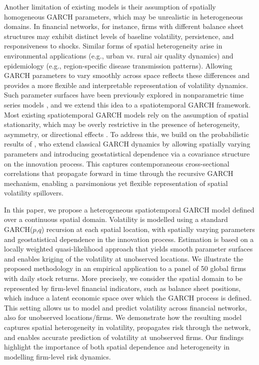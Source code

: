 \documentclass[fleqn,11pt]{article}
\begin{document}
Another limitation of existing models is their assumption of spatially homogeneous GARCH parameters, which may be unrealistic in heterogeneous domains. In financial networks, for instance, firms with different balance sheet structures may exhibit distinct levels of baseline volatility, persistence, and responsiveness to shocks. Similar forms of spatial heterogeneity arise in environmental applications (e.g., urban vs. rural air quality dynamics) and epidemiology (e.g., region-specific disease transmission patterns). Allowing GARCH parameters to vary smoothly across space reflects these differences and provides a more flexible and interpretable representation of volatility dynamics. Such parameter surfaces have been previously explored in nonparametric time series models \citep{Dahlhaus}, and we extend this idea to a spatiotemporal GARCH framework. Most existing spatiotemporal GARCH models rely on the assumption of spatial stationarity, which may be overly restrictive in the presence of heterogeneity, asymmetry, or directional effects \citep{Atika}. To address this, we build on the probabilistic results of \citet{Atika}, who extend classical GARCH dynamics by allowing spatially varying parameters and introducing geostatistical dependence via a covariance structure on the innovation process. This captures contemporaneous cross-sectional correlations that propagate forward in time through the recursive GARCH mechanism, enabling a parsimonious yet flexible representation of spatial volatility spillovers.

In this paper, we propose a heterogeneous spatiotemporal GARCH model defined over a continuous spatial domain. Volatility is modelled using a standard GARCH($p$,$q$) recursion at each spatial location, with spatially varying parameters and geostatistical dependence in the innovation process. Estimation is based on a locally weighted quasi-likelihood approach that yields smooth parameter surfaces and enables kriging of the volatility at unobserved locations. We illustrate the proposed methodology in an empirical application to a panel of 50 global firms with daily stock returns. More precisely, we consider the spatial domain to be represented by firm-level financial indicators, such as balance sheet positions, which induce a latent economic space over which the GARCH process is defined. This setting allows us to model and predict volatility across financial networks, also for unobserved locations/firms. We demonstrate how the resulting model captures spatial heterogeneity in volatility, propagates risk through the network, and enables accurate prediction of volatility at unobserved firms. Our findings highlight the importance of both spatial dependence and heterogeneity in modelling firm-level risk dynamics.
\end{document}
